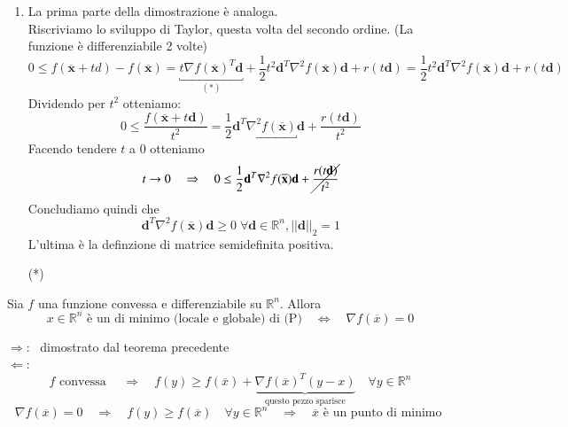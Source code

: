 \begin{thproof}
\begin{enumerate}
\item La prima parte della dimostrazione è analoga. \\ Riscriviamo lo
sviluppo di Taylor, questa volta del secondo ordine. (La funzione è
differenziabile 2 volte)
 $$ 0 \leq f(\overline{\mathbf{x}} + td) - f(\overline{\mathbf{x}}) =
 \underbracket{t \nabla f(\overline{\mathbf{x}})^{T} \mathbf{d}}_{(*)}
+ \frac{1}{2} t^{2} \mathbf{d}^{T} \nabla^{2} f(\overline{\mathbf{x}})
\mathbf{d} + r(t\mathbf{d}) = \frac{1}{2} t^{2} \mathbf{d}^{T}
\nabla^{2} f(\overline{\mathbf{x}}) \mathbf{d} + r(t\mathbf{d})
$$
Dividendo per $t^2$ otteniamo:
 $$ 0 \leq \frac{f(\overline{\mathbf{x}} + t\mathbf{d})}{t^2} = 
\frac{1}{2} \underbracket{\mathbf{d}^{T}\nabla^{2} f(\overline{\mathbf{x}})} \mathbf{d}
 + \frac{r(t\mathbf{d})}{t^2} 
$$
Facendo tendere $t$ a 0 otteniamo
$$
{t \rightarrow 0 \quad \Rightarrow \quad 0 \leq \frac{1}{2}
\mathbf{d}^{T} \nabla^{2}f(\overline{\mathbf{x}})\mathbf{d}} +
\cancel{\frac{r(t\mathbf{d})}{t^2}}
$$
Concludiamo quindi che
 $$ \mathbf{d}^{T} \nabla^{2} f(\overline{\mathbf{x}})\mathbf{d}
 \geq 0 \; \forall \mathbf{d}  \in \mathbb{R}^{n}, ||\mathbf{d}||_{2} = 1
$$
L'ultima è la definzione di matrice semidefinita positiva.
 \end{enumerate}
\begin{notes} 
\begin{itemize}
\item[(*)] 
\end{itemize}
\end{notes}


\end{thproof}
\begin{theo} Sia $f$ una funzione convessa e
differenziabile su $\mathbb{R}^{n}$. Allora
$$ x \in \mathbb{R}^{n}
\text{ \`e un di minimo (locale e globale) di (P)} \quad \Longleftrightarrow \quad
\nabla f(\overline{x}) = 0
$$
\end{theo}
\begin{thproof} $\Rightarrow$: \ dimostrato dal teorema precedente \\
$\Leftarrow$:
 $$ f \text{ convessa }  \quad \Longrightarrow \quad  f(y) \geq f(\overline{x}) +
 \underbrace{\nabla f(\overline{x})^{T}(y-x)}_{\text{questo pezzo sparisce}} \quad
 \forall y \in \mathbb{R}^{n} 
$$
$$ \nabla f(\overline{x}) = 0  
\quad \Longrightarrow \quad f(y) \geq f(\overline{x}) \quad \forall y
\in \mathbb{R}^{n} \quad \Longrightarrow \quad \overline{x}
 \text{ \`e un punto di minimo }
 $$
\end{thproof}

